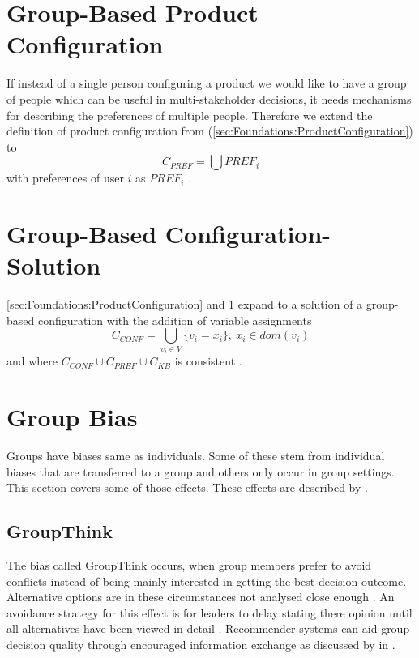 \section{Group-Based Product Configuration}
\label{sec:Foundations:GroupBasedProductConfiguration}

If instead of a single person configuring a product we would like to have a group of people which can be useful in multi-stakeholder decisions, it needs mechanisms for describing the preferences of multiple people. Therefore we extend the definition of product configuration from (\ref{sec:Foundations:ProductConfiguration}) to 
\[ 
    C_{PREF} = \bigcup 
PREF_i \]
with preferences of user \( i \) as \( PREF_i \) \cite{ felferningGroupBasedConfiguration2016}.

\section{Group-Based Configuration-Solution}
\label{sec:Foundations:GroupBasedConfigurationSolution}

\ref{sec:Foundations:ProductConfiguration} and \ref{sec:Foundations:GroupBasedProductConfiguration} expand to a solution of a group-based configuration with the addition of variable assignments
\[
    C_{CONF} = \bigcup_{v_i \in V} \{ v_i = x_i \}, \ x_i \in dom(v_i)
\]
and where \( C_{CONF} \cup C_{PREF} \cup C_{KB} \) is consistent \cite{ felferningGroupBasedConfiguration2016}.

\section{Group Bias}
\label{sec:Foundations:GroupBias}

Groups have biases same as individuals. Some of these stem from individual biases that are transferred to a group and others only occur in group settings. This section covers some of those effects. These effects are described by \citeauthor{felfernigBiasesGroupDecisions2018} \cite{felfernigBiasesGroupDecisions2018}.

\subsection{GroupThink}

The bias called GroupThink occurs, when group members prefer to avoid conflicts instead of being mainly interested in getting the best decision outcome. Alternative options are in these circumstances not analysed close enough \cite{janis1982groupthink}.
An avoidance strategy for this effect is for leaders to delay stating there opinion until all alternatives have been viewed in detail \citeauthor{felfernigBiasesGroupDecisions2018}. Recommender systems can aid group decision quality through encouraged information exchange as discussed by \citeauthor{atasItemRecommendationUsing2017} in \cite{atasItemRecommendationUsing2017}.


